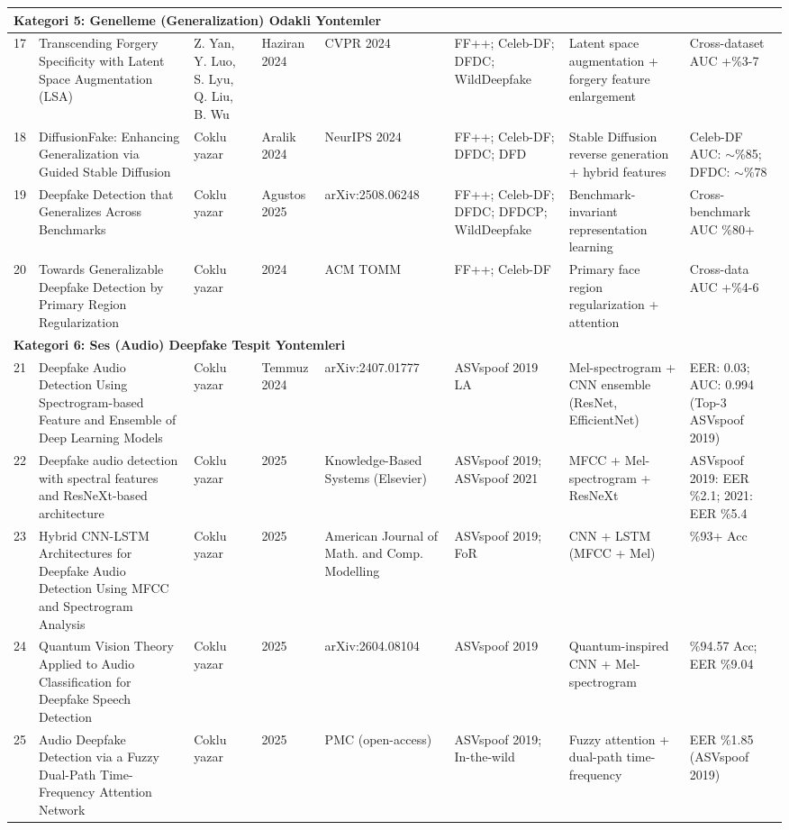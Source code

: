 \begin{landscape}
\begin{longtable}{@{}p{0.5cm} p{4.2cm} p{3.0cm} p{1.6cm} p{3.0cm} p{3.0cm} p{4.2cm} p{3.5cm}@{}}
\multicolumn{8}{l}{\textbf{Kategori 5: Genelleme (Generalization) Odakli Yontemler}} \\
\midrule
17 & Transcending Forgery Specificity with Latent Space Augmentation (LSA) & Z. Yan, Y. Luo, S. Lyu, Q. Liu, B. Wu & Haziran 2024 & CVPR 2024 & FF++; Celeb-DF; DFDC; WildDeepfake & Latent space augmentation + forgery feature enlargement & Cross-dataset AUC +\%3-7 \\
\midrule
18 & DiffusionFake: Enhancing Generalization via Guided Stable Diffusion & Coklu yazar & Aralik 2024 & NeurIPS 2024 & FF++; Celeb-DF; DFDC; DFD & Stable Diffusion reverse generation + hybrid features & Celeb-DF AUC: $\sim$\%85; DFDC: $\sim$\%78 \\
\midrule
19 & Deepfake Detection that Generalizes Across Benchmarks & Coklu yazar & Agustos 2025 & arXiv:2508.06248 & FF++; Celeb-DF; DFDC; DFDCP; WildDeepfake & Benchmark-invariant representation learning & Cross-benchmark AUC \%80+ \\
\midrule
20 & Towards Generalizable Deepfake Detection by Primary Region Regularization & Coklu yazar & 2024 & ACM TOMM & FF++; Celeb-DF & Primary face region regularization + attention & Cross-data AUC +\%4-6 \\
\midrule

\multicolumn{8}{l}{\textbf{Kategori 6: Ses (Audio) Deepfake Tespit Yontemleri}} \\
\midrule
21 & Deepfake Audio Detection Using Spectrogram-based Feature and Ensemble of Deep Learning Models & Coklu yazar & Temmuz 2024 & arXiv:2407.01777 & ASVspoof 2019 LA & Mel-spectrogram + CNN ensemble (ResNet, EfficientNet) & EER: 0.03; AUC: 0.994 (Top-3 ASVspoof 2019) \\
\midrule
22 & Deepfake audio detection with spectral features and ResNeXt-based architecture & Coklu yazar & 2025 & Knowledge-Based Systems (Elsevier) & ASVspoof 2019; ASVspoof 2021 & MFCC + Mel-spectrogram + ResNeXt & ASVspoof 2019: EER \%2.1; 2021: EER \%5.4 \\
\midrule
23 & Hybrid CNN-LSTM Architectures for Deepfake Audio Detection Using MFCC and Spectrogram Analysis & Coklu yazar & 2025 & American Journal of Math. and Comp. Modelling & ASVspoof 2019; FoR & CNN + LSTM (MFCC + Mel) & \%93+ Acc \\
\midrule
24 & Quantum Vision Theory Applied to Audio Classification for Deepfake Speech Detection & Coklu yazar & 2025 & arXiv:2604.08104 & ASVspoof 2019 & Quantum-inspired CNN + Mel-spectrogram & \%94.57 Acc; EER \%9.04 \\
\midrule
25 & Audio Deepfake Detection via a Fuzzy Dual-Path Time-Frequency Attention Network & Coklu yazar & 2025 & PMC (open-access) & ASVspoof 2019; In-the-wild & Fuzzy attention + dual-path time-frequency & EER \%1.85 (ASVspoof 2019) \\
\midrule


\end{longtable}
\end{landscape}
